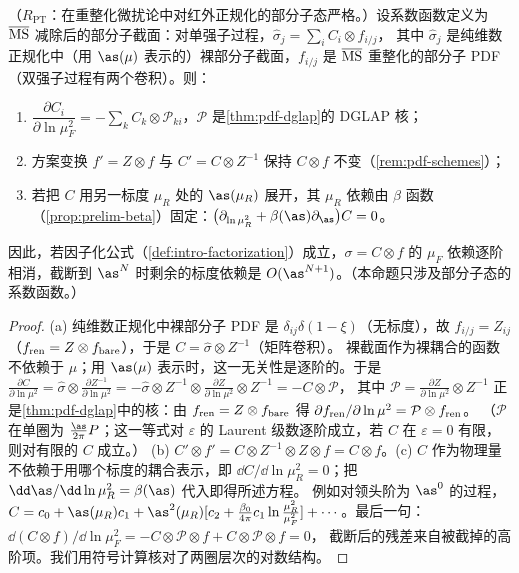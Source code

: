 \begin{proposition}\label{prop:method-scale-scheme}
（$R_{\mathrm{PT}}$：在重整化微扰论中对红外正规化的部分子态严格。）设系数函数定义为 $\overline{\rm MS}$ 减除后的部分子截面：对单强子过程，$\hat\sigma_j=\sum_iC_i\otimes f_{i/j}$，
其中 $\hat\sigma_j$ 是纯维数正规化中（用 $\as(\mu)$ 表示的）裸部分子截面，$f_{i/j}$ 是 $\overline{\rm MS}$ 重整化的部分子 PDF（双强子过程有两个卷积）。则：
\begin{enumerate}[label=(\alph*),leftmargin=2em,itemsep=1pt,topsep=2pt]
\item $\dfrac{\partial C_i}{\partial\ln\mu_F^2}=-\sum_kC_k\otimes\mathcal P_{ki}$，$\mathcal P$ 是\cref{thm:pdf-dglap}的 DGLAP 核；
\item 方案变换 $f'=Z\otimes f$ 与 $C'=C\otimes Z^{-1}$ 保持 $C\otimes f$ 不变（\cref{rem:pdf-schemes}）；
\item 若把 $C$ 用另一标度 $\mu_R$ 处的 $\as(\mu_R)$ 展开，其 $\mu_R$ 依赖由 $\beta$ 函数（\cref{prop:prelim-beta}）固定：$\bigl(\partial_{\ln\mu_R^2}+\beta(\as)\partial_{\as}\bigr)C=0$。
\end{enumerate}
因此，若因子化公式（\cref{def:intro-factorization}）成立，$\sigma=C\otimes f$ 的 $\mu_F$ 依赖逐阶相消，截断到 $\as^N$ 时剩余的标度依赖是 $O(\as^{N+1})$。（本命题只涉及部分子态的系数函数。）
\end{proposition}

\begin{proof}
(a) 纯维数正规化中裸部分子 PDF 是 $\delta_{ij}\delta(1-\xi)$（无标度），故 $f_{i/j}=Z_{ij}$（$f_{\rm ren}=Z\otimes f_{\rm bare}$），于是 $C=\hat\sigma\otimes Z^{-1}$（矩阵卷积）。
裸截面作为裸耦合的函数不依赖于 $\mu$；用 $\as(\mu)$ 表示时，这一无关性是逐阶的。于是
$\frac{\partial C}{\partial\ln\mu^2}=\hat\sigma\otimes\frac{\partial Z^{-1}}{\partial\ln\mu^2}=-\hat\sigma\otimes Z^{-1}\otimes\frac{\partial Z}{\partial\ln\mu^2}\otimes Z^{-1}=-C\otimes\mathcal P$，
其中 $\mathcal P=\frac{\partial Z}{\partial\ln\mu^2}\otimes Z^{-1}$ 正是\cref{thm:pdf-dglap}中的核：由 $f_{\rm ren}=Z\otimes f_{\rm bare}$ 得 $\partial f_{\rm ren}/\partial\ln\mu^2=\mathcal P\otimes f_{\rm ren}$。
（$\mathcal P$ 在单圈为 $\frac{\as}{2\pi}P$；这一等式对 $\varepsilon$ 的 Laurent 级数逐阶成立，若 $C$ 在 $\varepsilon=0$ 有限，则对有限的 $C$ 成立。）
(b) $C'\otimes f'=C\otimes Z^{-1}\otimes Z\otimes f=C\otimes f$。(c) $C$ 作为物理量不依赖于用哪个标度的耦合表示，即 $\dd C/\dd\ln\mu_R^2=0$；把 $\dd\as/\dd\ln\mu_R^2=\beta(\as)$ 代入即得所述方程。
例如对领头阶为 $\as^0$ 的过程，$C=c_0+\as(\mu_R)c_1+\as^2(\mu_R)[c_2+\frac{\beta_0}{4\pi}c_1\ln\frac{\mu_R^2}{\mu_F^2}]+\cdots$。最后一句：$\dd(C\otimes f)/\dd\ln\mu_F^2=-C\otimes\mathcal P\otimes f+C\otimes\mathcal P\otimes f=0$，
截断后的残差来自被截掉的高阶项。我们用符号计算核对了两圈层次的对数结构。%
\end{proof}

